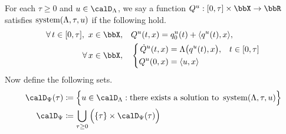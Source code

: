 \begin{definition}
  \label{definition:momentSpace}
  For each $\tau \geq 0$ and $\momentVar \in \odeSpace$, we say a function $Q^\momentVar: [0,\tau] \times \stateSpace \rightarrow \bbR$ satisfies $\operatorname{system}(\Lambda, \tau,u)$ if the following hold.
  \begin{align*}
    \forall\, t \in [0,\tau], ~ \stateVar \in \stateSpace, \quad
    & Q^\momentVar(t, \stateVar) = q_0^\momentVar(t) + \prj{q^\momentVar(t)}{\stateVar},  \\
    \forall\, \stateVar \in \stateSpace, \quad
    & \left\{\begin{aligned}
      \dot Q^\momentVar(t, \stateVar) &= \ode\big(q^\momentVar(t), \stateVar\big), & t \in [0,\tau] \\
      Q^\momentVar(0, \stateVar) &= \prj{\momentVar}{\stateVar}
    \end{aligned}\right.
  \end{align*}
  Now define the following sets.
  \begin{align*}
    \momentSpace(\tau) &\defeq \Big\{ \momentVar \in \odeSpace : \text{there exists a solution to } \system(\ode,\tau,\momentVar) \Big\} \\
    \momentSpace &\defeq \bigcup_{\tau\geq 0} \Big( \{\tau\} \times \momentSpace(\tau) \Big)
  \end{align*}
\end{definition}
